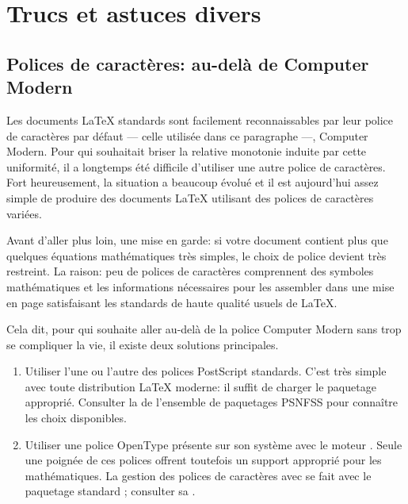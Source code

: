 \chapter{Trucs et astuces divers}
\label{chap:trucs}


\section{Polices de caractères: au-delà de Computer Modern}
\label{sec:trucs:police}

{\CM%
  Les documents {\LaTeX} standards sont facilement reconnaissables par
  leur police de caractères par défaut --- celle utilisée dans ce
  paragraphe ---, Computer Modern. Pour qui souhaitait briser la relative
  monotonie induite par cette uniformité, il a longtemps été difficile
  d'utiliser une autre police de caractères. Fort heureusement, la
  situation a beaucoup évolué et il est aujourd'hui assez simple de
  produire des documents {\LaTeX} utilisant des polices de caractères
  variées.}

Avant d'aller plus loin, une mise en garde: si votre document contient
plus que quelques équations mathématiques très simples, le choix de
police devient très restreint. La raison: peu de polices de caractères
comprennent des symboles mathématiques et les informations nécessaires
pour les assembler dans une mise en page satisfaisant les standards de
haute qualité usuels de {\LaTeX}.

Cela dit, pour qui souhaite aller au-delà de la police Computer Modern
sans trop se compliquer la vie, il existe deux solutions principales.

\begin{enumerate}
\item Utiliser l'une ou l'autre des polices PostScript standards.
  C'est très simple avec toute distribution {\LaTeX} moderne: il
  suffit de charger le paquetage approprié. Consulter la %
  de l'ensemble de paquetages PSNFSS pour connaître les choix
  disponibles.
\item Utiliser une police OpenType présente sur son système avec le
  moteur {\XeLaTeX}. Seule une poignée de ces polices offrent
  toutefois un support approprié pour les mathématiques. La gestion
  des polices de caractères avec {\XeLaTeX} se fait avec le paquetage
  standard ; consulter sa %
  .
\end{enumerate}

